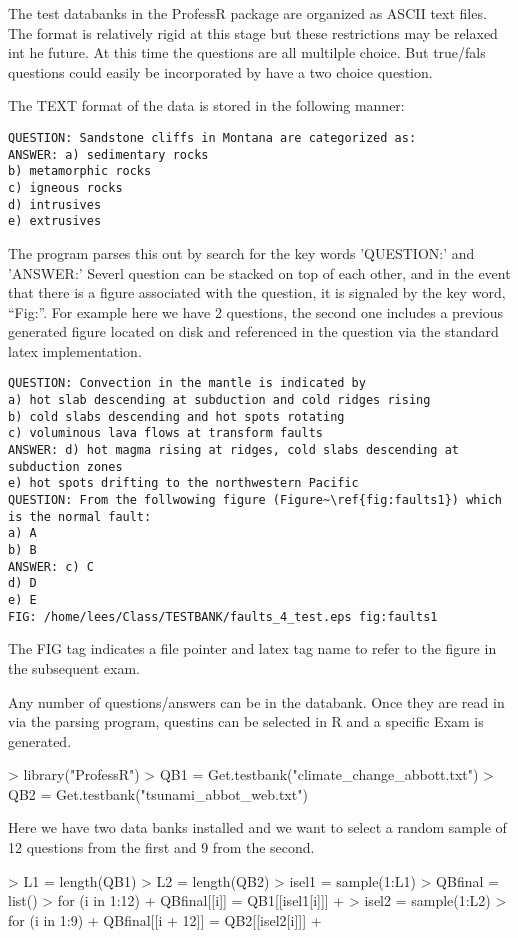 \documentclass{article}
\begin{document}
The test databanks in the ProfessR package are 
organized as ASCII text files.  The format is relatively rigid at this stage but
these restrictions may be relaxed int he future.
At this time the questions are all multilple choice.
But true/fals questions could easily be incorporated by 
have a two choice question.

The TEXT format of the data is stored
in the following manner:
\begin{verbatim}
QUESTION: Sandstone cliffs in Montana are categorized as:
ANSWER: a) sedimentary rocks
b) metamorphic rocks
c) igneous rocks
d) intrusives
e) extrusives
\end{verbatim}

The program parses this out by search for the key words 'QUESTION:' and 'ANSWER:'
Severl question can be stacked on top of each other,
and in the event that there is a figure associated 
with the question, it is signaled by the key word, ``Fig:''.
For example here we have 2 questions,
the second one includes a previous generated figure
located on disk and referenced in the question via
the standard latex implementation.
\begin{verbatim}
QUESTION: Convection in the mantle is indicated by
a) hot slab descending at subduction and cold ridges rising
b) cold slabs descending and hot spots rotating
c) voluminous lava flows at transform faults
ANSWER: d) hot magma rising at ridges, cold slabs descending at subduction zones
e) hot spots drifting to the northwestern Pacific
QUESTION: From the follwowing figure (Figure~\ref{fig:faults1}) which is the normal fault:
a) A
b) B
ANSWER: c) C
d) D
e) E
FIG: /home/lees/Class/TESTBANK/faults_4_test.eps fig:faults1

\end{verbatim}
The FIG tag indicates a file pointer and latex tag name to refer
to the figure in the subsequent exam.

Any number of questions/answers can be in the databank.
Once they are read in via the parsing program,
questins can be selected in R 
and a specific Exam is generated.
\begin{Schunk}
\begin{Sinput}
> library("ProfessR")
> QB1 = Get.testbank("climate_change_abbott.txt")
> QB2 = Get.testbank("tsunami_abbot_web.txt")
\end{Sinput}
\end{Schunk}
Here we have two data banks installed and we want to select a
random sample of 
12 questions from the first and 9 from the second.
\begin{Schunk}
\begin{Sinput}
> L1 = length(QB1)
> L2 = length(QB2)
> isel1 = sample(1:L1)
> QBfinal = list()
> for (i in 1:12) {
+     QBfinal[[i]] = QB1[[isel1[i]]]
+ }
> isel2 = sample(1:L2)
> for (i in 1:9) {
+     QBfinal[[i + 12]] = QB2[[isel2[i]]]
+ }
\end{Sinput}
\end{Schunk}
\end{document}
